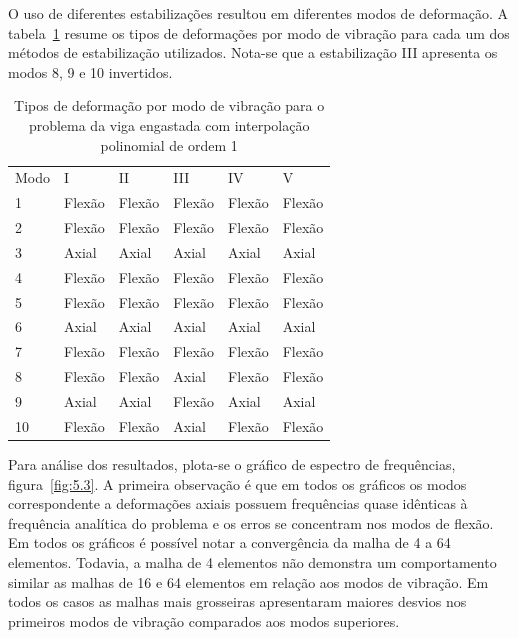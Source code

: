 \indent O uso de diferentes estabilizações resultou em diferentes modos de deformação. A tabela~\ref{tab:5.3} resume os tipos de deformações por modo de vibração para cada um dos métodos de estabilização utilizados. Nota-se que a estabilização III apresenta os modos 8, 9 e 10 invertidos.

\begin{table}[H]
\centering
\caption{Tipos de deformação por modo de vibração para o problema da viga engastada com interpolação polinomial de ordem 1}
\label{tab:5.3}
\begin{tabular}{@{}llllll@{}}
Modo & I      & II     & III    & IV     & V      \\
1    & Flexão & Flexão & Flexão & Flexão & Flexão \\
2    & Flexão & Flexão & Flexão & Flexão & Flexão \\
3    & Axial  & Axial  & Axial  & Axial  & Axial  \\
4    & Flexão & Flexão & Flexão & Flexão & Flexão \\
5    & Flexão & Flexão & Flexão & Flexão & Flexão \\
6    & Axial  & Axial  & Axial  & Axial  & Axial  \\
7    & Flexão & Flexão & Flexão & Flexão & Flexão \\
8    & Flexão & Flexão & Axial  & Flexão & Flexão \\
9    & Axial  & Axial  & Flexão & Axial  & Axial  \\
10   & Flexão & Flexão & Axial  & Flexão & Flexão
\end{tabular}
\end{table}


\indent Para análise dos resultados, plota-se o gráfico de espectro de frequências, figura~\ref{fig:5.3}. A primeira observação é que em todos os gráficos os modos correspondente a deformações axiais possuem frequências quase idênticas à frequência analítica do problema e os erros se concentram nos modos de flexão.\\
\indent Em todos os gráficos é possível notar a convergência da malha de 4 a 64 elementos. Todavia, a malha de 4 elementos não demonstra um comportamento similar as malhas de 16 e 64 elementos em relação aos modos de vibração. Em todos os casos as malhas mais grosseiras apresentaram maiores desvios nos primeiros modos de vibração comparados aos modos superiores.


